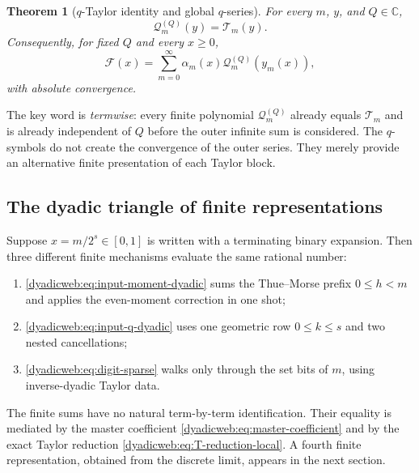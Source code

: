 \documentclass[11pt,oneside]{article}
\newtheorem{theorem}{Theorem}[section]
\theoremstyle{definition}
\theoremstyle{remark}
\newcommand{\C}{\mathbb C}
\begin{document}
\begin{theorem}[$q$-Taylor identity and global $q$-series]
\label{dyadicweb:thm:q-global-local}
For every $m$, $y$, and $Q\in\C$,
\begin{equation}
 \mathcal Q_m^{(Q)}(y)=\mathcal T_m(y).                   \label{dyadicweb:eq:Qm-equals-Tm-local}
\end{equation}
Consequently, for fixed $Q$ and every $x\ge0$,
\begin{equation}
 \boxed{
 \mathcal F(x)=\sum_{m=0}^{\infty}
 \alpha_m(x)\mathcal Q_m^{(Q)}(y_m(x)),}                 \label{dyadicweb:eq:global-q-series-local}
\end{equation}
with absolute convergence.
\end{theorem}

The key word is \emph{termwise}: every finite polynomial
$\mathcal Q_m^{(Q)}$ already equals $\mathcal T_m$ and is already independent of $Q$ before
the outer infinite sum is considered.  The $q$-symbols do not create the convergence of the
outer series.  They merely provide an alternative finite presentation of each Taylor block.

\subsection{The dyadic triangle of finite representations}

Suppose $x=m/2^s\in[0,1]$ is written with a terminating binary expansion.  Then three different
finite mechanisms evaluate the same rational number:
\begin{enumerate}
\item \eqref{dyadicweb:eq:input-moment-dyadic} sums the Thue--Morse prefix $0\le h<m$ and applies the
      even-moment correction in one shot;
\item \eqref{dyadicweb:eq:input-q-dyadic} uses one geometric row $0\le k\le s$ and two nested
      cancellations;
\item \eqref{dyadicweb:eq:digit-sparse} walks only through the set bits of $m$, using inverse-dyadic
      Taylor data.
\end{enumerate}
The finite sums have no natural term-by-term identification.  Their equality is mediated by
the master coefficient \eqref{dyadicweb:eq:master-coefficient} and by the exact Taylor reduction
\eqref{dyadicweb:eq:T-reduction-local}.  A fourth finite representation, obtained from the discrete
limit, appears in the next section.
\end{document}
